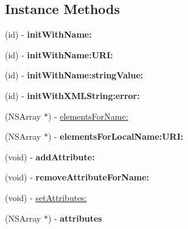 \subsection*{Instance Methods}
\begin{DoxyCompactItemize}
\item 
\hypertarget{interface_d_d_x_m_l_element_a75efb456f877953d7c20e6d9c8dfe595}{}(id) -\/ {\bfseries init\+With\+Name\+:}\label{interface_d_d_x_m_l_element_a75efb456f877953d7c20e6d9c8dfe595}

\item 
\hypertarget{interface_d_d_x_m_l_element_a30f00bac372eb59e4e148a7c9c469c2f}{}(id) -\/ {\bfseries init\+With\+Name\+:\+U\+R\+I\+:}\label{interface_d_d_x_m_l_element_a30f00bac372eb59e4e148a7c9c469c2f}

\item 
\hypertarget{interface_d_d_x_m_l_element_a3760d585e5a44525d3ab4f841bd0aed7}{}(id) -\/ {\bfseries init\+With\+Name\+:string\+Value\+:}\label{interface_d_d_x_m_l_element_a3760d585e5a44525d3ab4f841bd0aed7}

\item 
\hypertarget{interface_d_d_x_m_l_element_adfb62f474a53765b9453ba34431f2d31}{}(id) -\/ {\bfseries init\+With\+X\+M\+L\+String\+:error\+:}\label{interface_d_d_x_m_l_element_adfb62f474a53765b9453ba34431f2d31}

\item 
(N\+S\+Array $\ast$) -\/ \hyperlink{interface_d_d_x_m_l_element_ade39b932233b68fb940df57c13f8fdfa}{elements\+For\+Name\+:}
\item 
\hypertarget{interface_d_d_x_m_l_element_a58e9dfc13c423e691c578426f0eaef6d}{}(N\+S\+Array $\ast$) -\/ {\bfseries elements\+For\+Local\+Name\+:\+U\+R\+I\+:}\label{interface_d_d_x_m_l_element_a58e9dfc13c423e691c578426f0eaef6d}

\item 
\hypertarget{interface_d_d_x_m_l_element_a421b744620e05d0164eab3039b87b6e0}{}(void) -\/ {\bfseries add\+Attribute\+:}\label{interface_d_d_x_m_l_element_a421b744620e05d0164eab3039b87b6e0}

\item 
\hypertarget{interface_d_d_x_m_l_element_acbb6507fe3476bdbe861c84d96768cfd}{}(void) -\/ {\bfseries remove\+Attribute\+For\+Name\+:}\label{interface_d_d_x_m_l_element_acbb6507fe3476bdbe861c84d96768cfd}

\item 
(void) -\/ \hyperlink{interface_d_d_x_m_l_element_a09fe6369b02f710c120fd77ea60b9dc8}{set\+Attributes\+:}
\item 
\hypertarget{interface_d_d_x_m_l_element_a8e73a25ef8eeeac5cf59e4faaacb9a85}{}(N\+S\+Array $\ast$) -\/ {\bfseries attributes}\label{interface_d_d_x_m_l_element_a8e73a25ef8eeeac5cf59e4faaacb9a85}


\end{DoxyCompactItemize}

